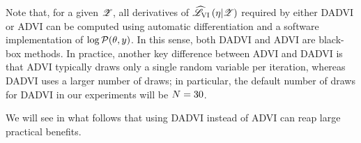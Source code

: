 Note that, for a given $\mathscr{Z}$, all derivatives of $\widehat{\mathscr{L}}_{\mathrm{VI}}\left(\eta | \mathscr{Z}\right)$ required by
either DADVI or ADVI can be computed using automatic differentiation and a
software implementation of $\log \mathcal{P}(\theta, y)$.  In this sense, both DADVI and
ADVI are black-box methods. 
In practice, another key difference between ADVI and DADVI is that ADVI
typically draws only a single random variable per iteration, whereas DADVI uses
a larger number of draws; in particular, the default number of draws for DADVI
in our experiments will be $N = 30$.

We will see in what follows that using DADVI instead of ADVI can reap large
practical benefits.
